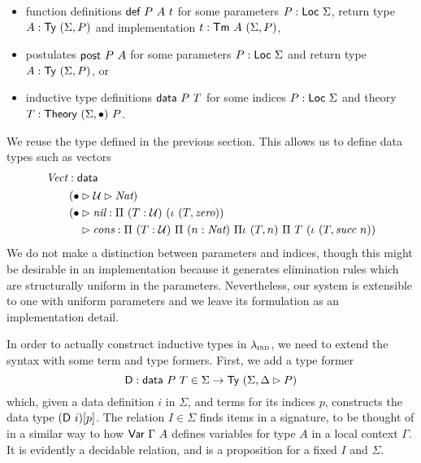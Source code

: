 \begin{itemize}
	\item function definitions $\mta{def}\ P\ A\ t$ for some parameters $P : \textsf{Loc}\
		      \Sigma$, return type $A : \textsf{Ty}\ (\Sigma, P)$ and implementation $t : \textsf{Tm}\ A\ (\Sigma, P)$,
	\item postulates $\textsf{post}\ P\ A$ for some parameters $P : \textsf{Loc}\
		      \Sigma$ and return type $A : \textsf{Ty}\ (\Sigma, P)$, or
	\item inductive type definitions $\mta{data}\ P\ T$ for some indices $P :
		      \textsf{Loc}\ \Sigma$ and theory $T : \textsf{Theory}\ (\Sigma, \bullet)\ P$.
\end{itemize}

We reuse the  type defined in the previous section. This allows us
to define data types such as vectors
\begin{align*}
	 & \textit{Vect} : \textsf{data}                                                                                                        \\
	 & \quad\begin{aligned}
		        \quad (\bullet & \rhd \mathcal{U} \rhd \textit{Nat})\                                                                               \\
		        \quad (\bullet & \rhd \textit{nil} : \Pi\ (T : \mathcal{U})\ (\iota\ (T, \textit{zero}))                                                          \\
		        \quad          & \rhd \textit{cons} : \Pi\ (T : \mathcal{U})\ \Pi\ (n : \textit{Nat})\ \Pi\iota\ (T, n)\ \Pi\ T\ (\iota\ (T, \textit{succ}\ n))
	        \end{aligned}
\end{align*}
We do not make a distinction between parameters and indices, though this might
be desirable in an implementation because it generates elimination rules which
are structurally uniform in the parameters. Nevertheless, our system is
extensible to one with uniform parameters and we leave its formulation as an
implementation detail.

In order to actually construct inductive types in $\lambda_{\textsc{ind}}$, we need to
extend the syntax with some term and type formers. First, we add a type former
\[
	\mta{D} : \mta{data}\ P\ T \in \Sigma \to \Ty\ (\Sigma, \Delta \rhd P)
\]
which, given a data definition $i$ in $\Sigma$, and terms for its
indices $p$, constructs the data type $(\mta{D}\ i)[p]$. The relation $I \in
\Sigma$ finds items in a signature, to be thought of in a similar way to how
$\mta{Var}\ \Gamma\ A$ defines variables for type $A$ in a local context
$\Gamma$. It is evidently a decidable relation, and is a proposition for a fixed
$I$ and $\Sigma$.

